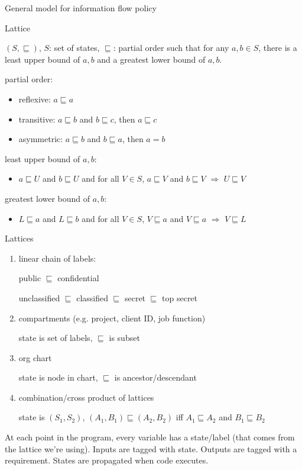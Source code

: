 General model for information flow policy

\begin{definition}{Lattice}

    $(S, \sqsubseteq)$, $S$: set of states, $\sqsubseteq$: partial order such
    that for any $a, b \in S$, there is a least upper bound of $a, b$ and a
    greatest lower bound of $a,b$.

    partial order:
    \begin{itemize}
        \item reflexive: $a \sqsubseteq a$
        \item transitive: $a \sqsubseteq b$ and $b \sqsubseteq c$, then
            $a \sqsubseteq c$
        \item asymmetric: $a \sqsubseteq b$ and $b \sqsubseteq a$, then $a = b$
    \end{itemize}
    least upper bound of $a, b$:
    \begin{itemize}
        \item $a \sqsubseteq U$ and $b \sqsubseteq U$ and for all $V \in S$,
            $a \sqsubseteq V$ and $b \sqsubseteq V$ $\Rightarrow$
            $U \sqsubseteq V$
    \end{itemize}
    greatest lower bound of $a, b$:
    \begin{itemize}
        \item $L \sqsubseteq a$ and $L \sqsubseteq b$ and for all $V \in S$,
            $V \sqsubseteq a$ and $V \sqsubseteq a$ $\Rightarrow$
            $V \sqsubseteq L$
    \end{itemize}
\end{definition}
\begin{example}{Lattices}
    \begin{enumerate}
        \item linear chain of labels:

            public $\sqsubseteq$ confidential

            unclassified $\sqsubseteq$ classified $\sqsubseteq$ secret
                $\sqsubseteq$ top secret
        \item compartments (e.g. project, client ID, job function)

            state is set of labels, $\sqsubseteq$ is subset
        \item org chart

            state is node in chart, $\sqsubseteq$ is ancestor/descendant
        \item combination/cross product of lattices

            state is $(S_1, S_2)$, $(A_1, B_1) \sqsubseteq (A_2, B_2)$ iff
            $A_1 \sqsubseteq A_2$ and $B_1 \sqsubseteq B_2$
    \end{enumerate}
\end{example}
At each point in the program, every variable has a state/label (that comes from the
lattice we're using). Inputs are tagged with state. Outputs are tagged with a requirement. States are propagated
when code executes.


